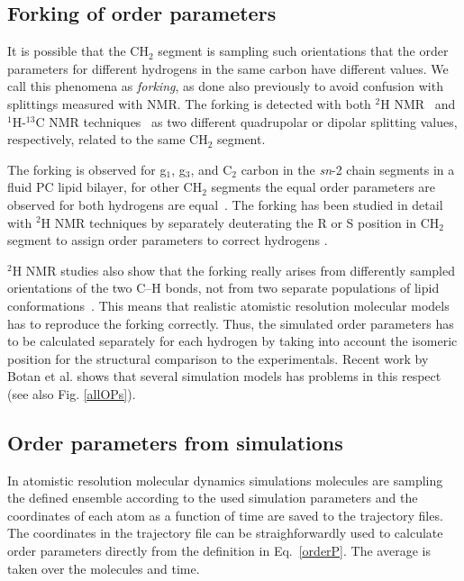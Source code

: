 \documentclass[aps,prl,superscriptaddress,twocolumn]{revtex4}
\begin{document}
\subsection{Forking of order parameters}

It is possible that the CH$_2$ segment is sampling such orientations that the order parameters
for different hydrogens in the same carbon have different values. We call this phenomena as 
{\it forking}, as done also previously to avoid confusion with splittings measured with NMR.
The forking is detected with both $^2$H NMR~\cite{seelig75,seelig78,engel81,gally81} and 
$^1$H-$^{13}$C NMR techniques~\cite{gross97,dvinskikh05a,ferreira13} as two different quadrupolar or dipolar splitting values,
respectively, related to the same CH$_2$ segment.

The forking is observed for g$_1$, g$_3$, and  C$_2$ carbon in the \textit{sn}-2 chain segments in
a fluid PC lipid bilayer, for other CH$_2$ segments the equal order parameters are observed for 
both hydrogens are equal~\cite{seelig74,seelig77,seelig78,gally81,gross97,dvinskikh05a,ferreira13}.
The forking has been studied in detail with $^2$H NMR techniques by separately deuterating the 
R or S position in CH$_2$ segment to assign order parameters to correct hydrogens \cite{gally81,engel81}.


$^2$H NMR studies also show that the forking really arises from differently sampled orientations 
of the two C--H bonds, not from two separate populations of lipid conformations~\cite{engel81,gally81}.
This means that realistic atomistic resolution molecular models has to reproduce the forking 
correctly. Thus, the simulated order parameters has to be calculated separately for each hydrogen
by taking into account the isomeric position for the structural comparison to the experimentals.
Recent work by Botan et al. shows that several simulation models has problems in this respect \cite{botan15}
(see also Fig. \ref{allOPs}). 




\subsection{Order parameters from simulations}
In atomistic resolution molecular dynamics simulations molecules are sampling the defined ensemble
according to the used simulation parameters and the coordinates of each atom as a function of time are saved
to the trajectory files. The coordinates in the trajectory file can be straighforwardly used to calculate 
order parameters directly from the definition in Eq.~\ref{orderP}. The average is taken over the molecules and time.
\end{document}
